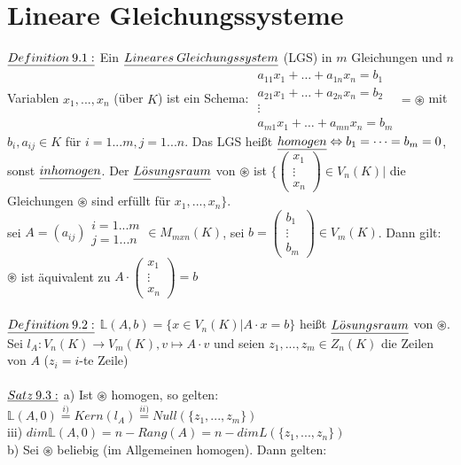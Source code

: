 \documentclass[fleqn, a4paper, 11pt]{article}
\begin{document}
\section{Lineare Gleichungssysteme}

$\uline{Definition\:9.1:}$ Ein $\uline{Lineares\:Gleichungssystem}$ (LGS) in $m$ Gleichungen und $n$ Variablen $x_1,...,x_n$ (\"uber $K$) ist ein Schema: $\begin{matrix}
	a_{11}x_1 +\dots + a_{1n}x_n=b_1\\
	a_{21}x_1 +\dots + a_{2n}x_n=b_2\\
	\vdots\\
	a_{m1}x_1+\dots +a_{mn}x_n=b_m
\end{matrix}=\circledast$ mit $b_i,a_{ij}\in K$ f\"ur $i=1...m,j=1...n$. Das LGS hei\ss{}t $\uline{homogen}\Leftrightarrow b_1=\dots=b_m=0$, sonst $\uline{inhomogen}$. Der $\uline{L\ddot{o}sungsraum}$ von $\circledast$ ist $\{\begin{pmatrix}
	x_1\\
	\vdots\\
	x_n
\end{pmatrix}\in V_n(K)|$ die Gleichungen $\circledast$ sind erf\"ullt f\"ur $x_1,...,x_n\}$.\\
sei $A=(a_{ij})\substack{i=1...m\\j=1...n}\in M_{mxn}(K)$, sei $b=\begin{pmatrix}
	b_1\\
	\vdots\\
	b_m
\end{pmatrix}\in V_m(K)$. Dann gilt: $\circledast$ ist \"aquivalent zu $A\cdot\begin{pmatrix}
	x_1\\
	\vdots\\
	x_n
\end{pmatrix}=b$\\
\\
$\uline{Definition\:9.2:}$ $\mathbb{L}(A,b)=\{x\in V_n(K)|A\cdot x=b\}$ hei\ss{}t $\uline{L\ddot{o}sungsraum}$ von $\circledast$. Sei $l_A:V_n(K)\rightarrow V_m(K),v\mapsto A\cdot v$ und seien $z_1,...,z_m\in Z_n(K)$ die Zeilen von $A$ ($z_i=i$-te Zeile)\\
\\
$\uline{Satz\:9.3:}$ a) Ist $\circledast$ homogen, so gelten: $\mathbb{L}(A,0)\stackrel{i)}{=}Kern(l_A)\stackrel{ii)}{=}Null(\{z_1,...,z_m\})$\\
iii) $dim \mathbb{L}(A,0)=n-Rang(A)=n-dim L(\{z_1,...,z_n\})$\\
b) Sei $\circledast$ beliebig (im Allgemeinen homogen). Dann gelten:\\
\end{document}
